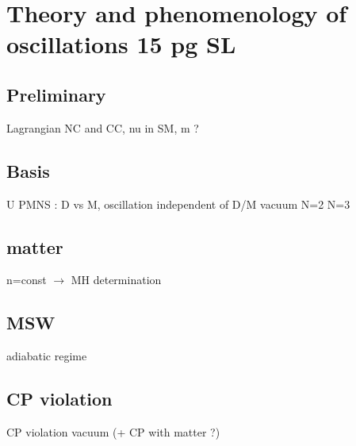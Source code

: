 \section{Theory and phenomenology of oscillations 15 pg SL}
\label{sec:th}

\subsection{Preliminary}

Lagrangian NC and CC, nu in SM, m ?

\subsection{Basis}

U PMNS : D vs M, oscillation independent of D/M
vacuum N=2 N=3

\subsection{matter}
n=const  $\rightarrow$ MH determination 

\subsection{MSW}
adiabatic regime


\subsection{CP violation}

CP violation vacuum (+ CP with matter ?)
